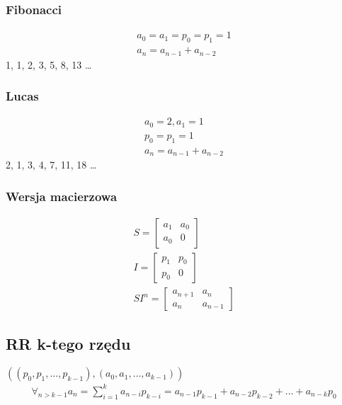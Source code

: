 \documentclass{article}
\begin{document}
\subsubsection{Fibonacci}
\begin{gather*}
a_0 = a_1 = p_0 = p_1 = 1 \\
a_n = a_{n-1} + a_{n-2}
\end{gather*}
1, 1, 2, 3, 5, 8, 13 \dots

\subsubsection{Lucas}
\begin{gather*}
a_0 = 2, a_1 = 1 \\
p_0 = p_1 = 1 \\
a_n = a_{n-1} + a_{n-2}
\end{gather*}
2, 1, 3, 4, 7, 11, 18 \dots

\subsubsection{Wersja macierzowa}
\begin{gather*}
S = \begin{bmatrix}
a_1 & a_0 \\
a_0 & 0
\end{bmatrix} \\
I = \begin{bmatrix}
p_1 & p_0 \\
p_0 & 0
\end{bmatrix} \\
SI^n = \begin{bmatrix}
a_{n+1} & a_{n} \\
a_{n} & a_{n-1}
\end{bmatrix}
\end{gather*}

\subsection {RR k-tego rzędu}
$((p_0, p_1, \dots, p_{k-1}), (a_0, a_1, \dots, a_{k-1})) $
\begin{gather*}
\forall_{n > k - 1} a_n = \sum_{i=1}^{k} a_{n - i} p_{k - i} = a_{n-1} p_{k - 1} + a_{n-2} p_{k-2} + \dots + a_{n-k} p_{0}
\end{gather*}
\end{document}
